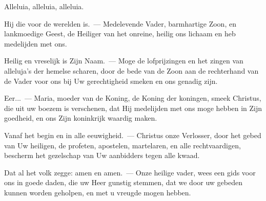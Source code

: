 \documentclass[12pt,twoside,a5paper]{article}
\begin{document}
\begin{halfparskip}
   Alleluia, alleluia, alleluia.
\end{halfparskip}




\begin{halfparskip}
  Hij die voor de werelden is.~--- Medelevende Vader, barmhartige Zoon, en lankmoedige Geest, de Heiliger van het onreine, heilig ons lichaam en heb medelijden met ons.

  Heilig en vreselijk is Zijn Naam.~--- Moge de lofprijzingen en het zingen van alleluja's der hemelse scharen, door de bede van de Zoon aan de rechterhand van de Vader voor ons bij Uw gerechtigheid smeken en ons genadig zijn.

  Eer...~--- Maria, moeder van de Koning, de Koning der koningen, smeek Christus, die uit uw boezem is verschenen, dat Hij medelijden met ons moge hebben in Zijn goedheid, en ons Zijn koninkrijk waardig maken.

  Vanaf het begin en in alle eeuwigheid.~--- Christus onze Verlosser, door het gebed van Uw heiligen, de profeten, apostelen, martelaren, en alle rechtvaardigen, bescherm het gezelschap van Uw aanbidders tegen alle kwaad.

  Dat al het volk zegge: amen en amen.~--- Onze heilige vader, wees een gids voor ons in goede daden, die uw Heer gunstig stemmen, dat we door uw gebeden kunnen worden geholpen, en met u vreugde mogen hebben.
\end{halfparskip}

\end{document}
